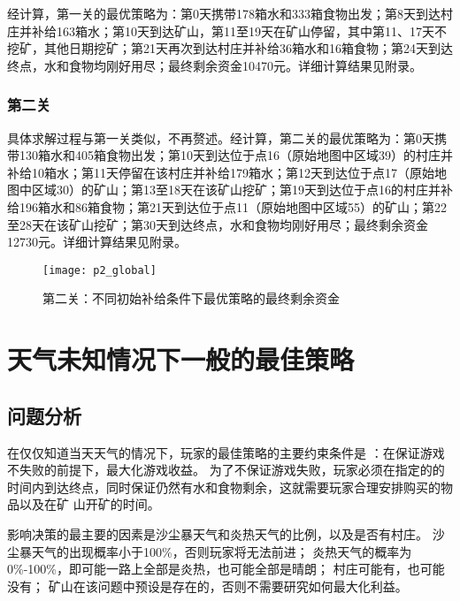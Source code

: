\documentclass[bwprint]{cumcmthesis} %
\begin{document}
经计算，第一关的最优策略为：第0天携带178箱水和333箱食物出发；第8天到达村庄并补给163箱水；第10天到达矿山，第11至19天在矿山停留，其中第11、17天不挖矿，其他日期挖矿；第21天再次到达村庄并补给36箱水和16箱食物；第24天到达终点，水和食物均刚好用尽；最终剩余资金10470元。详细计算结果见附录。
\subsubsection{第二关}
具体求解过程与第一关类似，不再赘述。经计算，第二关的最优策略为：第0天携带130箱水和405箱食物出发；第10天到达位于点16（原始地图中区域39）的村庄并补给10箱水；第11天停留在该村庄并补给179箱水；第12天到达位于点17（原始地图中区域30）的矿山；第13至18天在该矿山挖矿；第19天到达位于点16的村庄并补给196箱水和86箱食物；第21天到达位于点11（原始地图中区域55）的矿山；第22至28天在该矿山挖矿；第30天到达终点，水和食物均刚好用尽；最终剩余资金12730元。详细计算结果见附录。

\begin{figure}
    \centering
    \texttt{[image: p2\_global]}
    \caption{第二关：不同初始补给条件下最优策略的最终剩余资金}
    \label{p2_global}
\end{figure}

\section{天气未知情况下一般的最佳策略}
\label{sec:simulate}

\subsection{问题分析}

在仅仅知道当天天气的情况下，玩家的最佳策略的主要约束条件是 ：在保证游戏不失败的前提下，最大化游戏收益。
为了不保证游戏失败，玩家必须在指定的的时间内到达终点，同时保证仍然有水和食物剩余，这就需要玩家合理安排购买的物品以及在矿
山开矿的时间。

影响决策的最主要的因素是沙尘暴天气和炎热天气的比例，以及是否有村庄。
沙尘暴天气的出现概率小于100\%，否则玩家将无法前进；
炎热天气的概率为0\%-100\%，即可能一路上全部是炎热，也可能全部是晴朗；
村庄可能有，也可能没有；
矿山在该问题中预设是存在的，否则不需要研究如何最大化利益。


\end{document}
